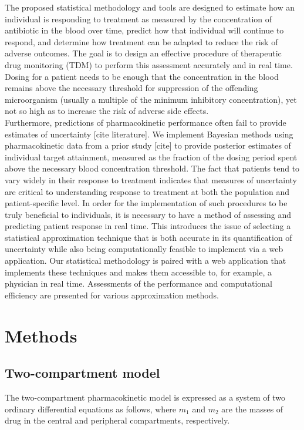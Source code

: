 \documentclass{article}\usepackage[]{graphicx}\usepackage[]{color}
\begin{document}
The proposed statistical methodology and tools are designed to estimate how an individual is responding to treatment as measured by the concentration of antibiotic in the blood over time, predict how that individual will continue to respond, and determine how treatment can be adapted to reduce the risk of adverse outcomes.  The goal is to design an effective procedure of therapeutic drug monitoring (TDM) to perform this assessment accurately and in real time. Dosing for a patient needs to be enough that the concentration in the blood remains above the necessary threshold for suppression of the offending microorganism (usually a multiple of the minimum inhibitory concentration), yet not so high as to increase the risk of adverse side effects.\\

Furthermore, predictions of pharmacokinetic performance often fail to provide estimates of uncertainty [cite literature]. We implement Bayesian methods using pharmacokinetic data from a prior study [cite] to provide posterior estimates of individual  target attainment, measured as the fraction of the dosing period spent above the necessary blood concentration threshold. The fact that patients tend to vary widely in their response to treatment indicates that measures of uncertainty are critical to understanding response to treatment at both the population and patient-specific level. In order for the implementation of such procedures to be truly beneficial to individuals, it is necessary to have a method of assessing and predicting patient response in real time. This introduces the issue of selecting a statistical approximation technique that is both accurate in its quantification of uncertainty while also being computationally feasible to implement via a web application. Our statistical methodology is paired with a web application that implements these techniques and makes them accessible to, for example, a physician in real time. Assessments of the performance and computational efficiency are presented for various approximation methods.

\section{Methods}
\subsection{Two-compartment model}
The two-compartment pharmacokinetic model is expressed as a system of two ordinary differential equations as follows, where $m_1$ and $m_2$ are the masses of drug in the central and peripheral compartments, respectively.
\end{document}
